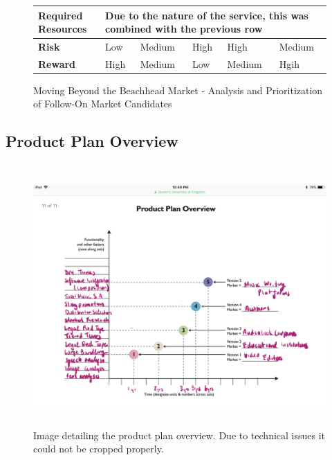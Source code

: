 \documentclass{article}
\begin{document}
\begin{figure}[h!]
\begin{center}
\begin{tabular} { | p{1.75cm} | p{2cm} | p{2cm} | p{2cm} | p{2cm} | p{2cm} |}
                    \tabularnewline \hline
                    \raggedright \textbf{Required Resources} & \multicolumn{5}{l}{Due to the nature of the service, this was combined with the previous row} 
                    \tabularnewline \hline
                    \textbf{Risk} & Low & Medium & High & High & Medium 
                    \tabularnewline \hline
                    \textbf{Reward} & High & Medium & Low & Medium & Hgih 
                    \tabularnewline \hline
                \end{tabular}
            \end{center}
            \caption{Moving Beyond the Beachhead Market - Analysis and Prioritization of Follow-On Market Candidates}
        \end{figure}
    
    \subsection{Product Plan Overview}
    \begin{figure}[h!]
        \begin{center}
            \includegraphics[width=15cm,height=10cm]{ProductPlan}
            \caption{Image detailing the product plan overview. Due to technical issues it could not be cropped properly.}
        \end{center}
    \end{figure}

    \cleardoublepage
\end{document}
